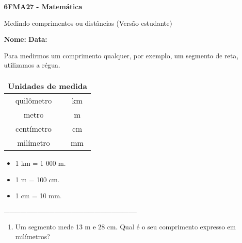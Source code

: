 \documentclass[a4paper,14pt]{article}
\begin{document}
	
	\noindent\textbf{6FMA27 - Matemática} 
	
	\begin{center}Medindo comprimentos ou distâncias (Versão estudante)
	\end{center}
	
	\noindent\textbf{Nome:} \underline{\hspace{10cm}}
	\noindent\textbf{Data:} \underline{\hspace{4cm}}
	
	
	\begin{multicols}{2}
		\noindent Para medirmos um comprimento qualquer, por exemplo, um segmento de reta, utilizamos a régua.
		\\
		\begin{center}
			\begin{tabular}[H]{|c|c|}
				\hline
				\multicolumn{2}{|c|}{\textbf{Unidades de medida}} \\ \hline
				quilômetro & km \\ \hline
				metro & m \\ \hline
				centímetro & cm \\ \hline
				milímetro & mm \\ \hline
			\end{tabular}
		\end{center}
		\begin{itemize}
			\item 1 km = 1 000 m.
			\item 1 m = 100 cm.
			\item 1 cm = 10 mm.
		\end{itemize}
		\noindent\textsubscript{-----------------------------------------------------------------------}
		\begin{enumerate} 
			\item Um segmento mede 13 m e 28 cm. Qual é o seu comprimento expresso em milímetros? \\\\\\\\\\\\\\\\\\\\\\\\\\\\

\end{enumerate}
\end{multicols}
\end{document}
